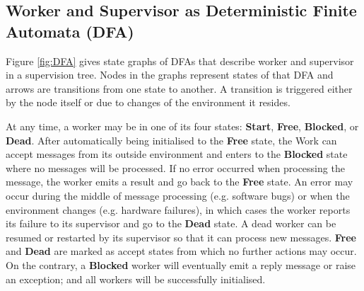 \documentclass[12pt, authoryear]{article}
\begin{document}

\subsection{Worker and Supervisor as Deterministic Finite Automata (DFA)} 
\label{DFA}

Figure \ref{fig:DFA} gives state graphs of DFAs that describe 
worker and supervisor in a supervision tree.  Nodes in the graphs represent 
states of that DFA and arrows are transitions from one state to another.  A 
transition is triggered either by the node itself or due to changes of the 
environment it resides.

At any time, a worker may be in one of its four states: {\bf Start}, {\bf 
Free}, {\bf Blocked}, or {\bf Dead}.  After automatically being initialised to 
the {\bf Free} state, the Work can accept messages from its outside 
environment and enters to the {\bf Blocked} state where no messages will be 
processed.  If no error occurred when processing the message, the worker emits 
a result and go back to the {\bf Free} state.  An error may occur during the 
middle of message processing (e.g. software bugs) or when the environment 
changes (e.g. hardware failures), in which cases the worker reports its failure 
to its supervisor and go to the {\bf Dead} state.  A dead worker can be resumed 
or restarted by its supervisor so that it can process new messages.  {\bf Free} 
and {\bf Dead} are marked as accept states from which no further actions may 
occur.  On the contrary, a {\bf Blocked} worker will eventually emit a reply 
message or raise an exception; and all workers will be successfully initialised.
\end{document}
